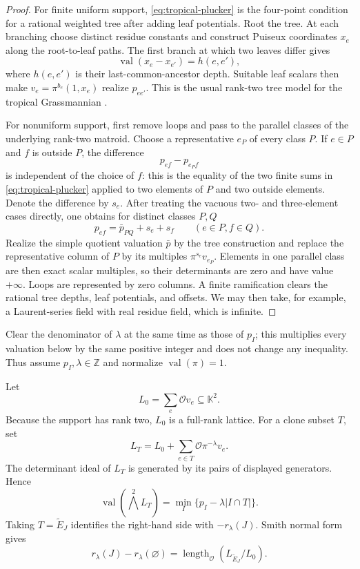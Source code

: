 \documentclass[11pt]{article}
\theoremstyle{remark}
\newcommand{\K}{\mathbb{K}}
\newcommand{\OO}{\mathcal{O}}
\newcommand{\length}{\operatorname{length}}
\newcommand{\val}{\operatorname{val}}
\begin{document}
\begin{proof}
For finite uniform support, \eqref{eq:tropical-plucker} is the four-point
condition for a rational weighted tree after adding leaf potentials.  Root
the tree.  At each branching choose distinct residue constants and construct
Puiseux coordinates $x_e$ along the root-to-leaf paths.  The first branch at
which two leaves differ gives
\[
 \val(x_e-x_{e'})=h(e,e'),
\]
where $h(e,e')$ is their last-common-ancestor depth.  Suitable leaf scalars
then make $v_e=\pi^{b_e}(1,x_e)$ realize $p_{ee'}$.  This is the usual
rank-two tree model for the tropical Grassmannian
\cite{SpeyerSturmfels2004}.

For nonuniform support, first remove loops and pass to the parallel classes
of the underlying rank-two matroid.  Choose a representative $e_P$ of every
class $P$.  If $e\in P$ and $f$ is outside $P$, the difference
\[
 p_{ef}-p_{e_Pf}
\]
is independent of the choice of $f$: this is the equality of the two finite
sums in \eqref{eq:tropical-plucker} applied to two elements of $P$ and two
outside elements.  Denote the difference by $s_e$.  After treating the
vacuous two- and three-element cases directly, one obtains for distinct
classes $P,Q$
\[
 p_{ef}=\bar p_{PQ}+s_e+s_f
 \qquad(e\in P, f\in Q).
\]
Realize the simple quotient valuation $\bar p$ by the tree construction and
replace the representative column of $P$ by its multiples $\pi^{s_e}v_{e_P}$.
Elements in one parallel class are then exact scalar multiples, so their
determinants are zero and have value $+\infty$.  Loops are represented by
zero columns.  A finite ramification clears the rational tree depths, leaf
potentials, and offsets.  We may then take, for example, a Laurent-series
field with real residue field, which is infinite.
\end{proof}

Clear the denominator of $\lambda$ at the same time as those of $p_I$; this
multiplies every valuation below by the same positive integer and does not
change any inequality.  Thus assume $p_I,\lambda\in\mathbb Z$ and normalize
$\val(\pi)=1$.

Let
\[
 L_0=\sum_e\OO v_e\subseteq\K^2.
\]
Because the support has rank two, $L_0$ is a full-rank lattice.  For a clone
subset $T$, set
\[
 L_T=L_0+\sum_{e\in T}\OO\pi^{-\lambda}v_e.
\]
The determinant ideal of $L_T$ is generated by its pairs of displayed
generators.  Hence
\[
 \val(\bigwedge^2 L_T)
 =\min_I\{p_I-\lambda|I\cap T|\}.
\]
Taking $T=\widetilde E_J$ identifies the right-hand side with
$-r_\lambda(J)$.  Smith normal form gives
\begin{equation}
 r_\lambda(J)-r_\lambda(\varnothing)
 =\length_\OO(L_{\widetilde E_J}/L_0).
 \label{eq:length-rank}
\end{equation}
\end{document}
